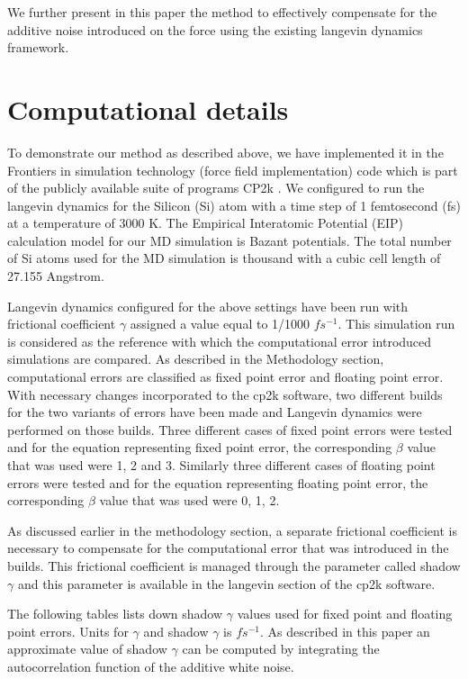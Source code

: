 \documentclass[aps,pre,twocolumn,showpacs,preprintnumbers,amsmath,amssymb]{revtex4-1}
\begin{document}
We further present in this paper the method to effectively compensate for the additive noise introduced on the force using the existing langevin dynamics framework. 

 
\section{Computational details}

To demonstrate our method as described above, we have implemented it in the Frontiers in simulation technology (force field implementation) code which is part of the publicly available suite of programs CP2k \cite{cp2kwebsite}. We configured to run the langevin dynamics for the Silicon (Si) atom with a time step of 1 femtosecond (fs) at a temperature of 3000 K. The Empirical Interatomic Potential (EIP) calculation model for our MD simulation is Bazant potentials. The total number of Si atoms used for the MD simulation is thousand with a cubic cell length of 27.155 Angstrom. 

Langevin dynamics configured for the above settings have been run with frictional coefficient \(\gamma\) assigned a value equal to 1/1000 \(fs^{-1}\). This simulation run is considered as the reference with which the computational error introduced simulations are compared. As described in the Methodology section, computational errors are classified as fixed point error and floating point error. With necessary changes incorporated to the cp2k software, two different builds for the two variants of errors have been made and Langevin dynamics were performed on those builds. Three different cases of fixed point errors were tested and for the equation representing fixed point error, the corresponding \(\beta\) value that was used were 1, 2 and 3. Similarly three different cases of floating point errors were tested and for the equation representing floating point error, the corresponding \(\beta\) value that was used were 0, 1, 2.

As discussed earlier in the methodology section, a separate frictional coefficient is necessary to compensate for the computational error that was  introduced in the builds. This frictional coefficient is managed through the parameter called shadow \(\gamma\) and this parameter is available in the langevin section of the cp2k software.   

The following tables lists down shadow \(\gamma\) values used for fixed point and floating point errors.  Units for \(\gamma\) and shadow \(\gamma\) is \(fs^{-1}\). As described in this paper \cite{ShadowGammaEstimate} an approximate value of shadow \(\gamma\) can be computed by integrating the autocorrelation function of the additive white noise. \\\\\\
\end{document}
